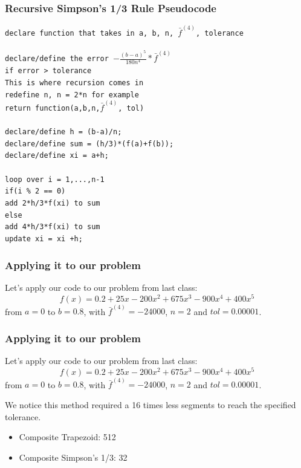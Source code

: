 \documentclass{if-beamer}
\begin{document}
\begin{frame}
	\frametitle{Recursive Simpson's 1/3 Rule Pseudocode}
	\texttt{declare function that takes in a, b, n, $\bar{f}^{(4)}$, tolerance}\\
	\texttt{ }
	\\\texttt{declare/define the error $-\frac{(b-a)^5}{180n^4}* \bar{f}^{(4)}$}\\\vspace{2pt}
	\texttt{if error > tolerance}\\
	\texttt{This is where recursion comes in}\\
	\texttt{\qquad redefine n, n = 2*n for example}\\
	\texttt{\qquad return function(a,b,n,$\bar{f}^{(4)}$, tol)}\\
	\texttt{ } \\
	\texttt{declare/define h = (b-a)/n;}\\
	\texttt{declare/define sum = (h/3)*(f(a)+f(b)); }\\
	\texttt{declare/define xi = a+h;}\\
	\texttt{ }\\
	\texttt{loop over i = 1,...,n-1 }\\
	\texttt{\qquad if(i \% 2 == 0)}\\
	\texttt{\qquad \qquad add 2*h/3*f(xi) to sum} \\
	\texttt{\qquad else}\\
	\texttt{\qquad \qquad add 4*h/3*f(xi) to sum} \\
	\texttt{\qquad update xi = xi +h;}\\
\end{frame}

\begin{frame}
	\frametitle{Applying it to our problem}
	Let's apply our code to our problem from last class:
	$$f(x) =0.2+25x-200x^2+675x^3-900x^4+400x^5$$
	from $a = 0$ to $b=0.8$, with $\bar{f}^{(4)} = -24000$, $n=2$ and $tol = 0.00001$.
\end{frame}

\begin{frame}
	\frametitle{Applying it to our problem}
	Let's apply our code to our problem from last class:
	$$f(x) =0.2+25x-200x^2+675x^3-900x^4+400x^5$$
	from $a = 0$ to $b=0.8$, with $\bar{f}^{(4)} = -24000$, $n=2$ and $tol = 0.00001$.\\\vspace{1cm}
	
	We notice this method required a 16 times less segments to reach the specified tolerance.
	\begin{itemize}
		\item Composite Trapezoid: 512
		\item Composite Simpson's 1/3: 32
	\end{itemize}
	
\end{frame}
\end{document}
